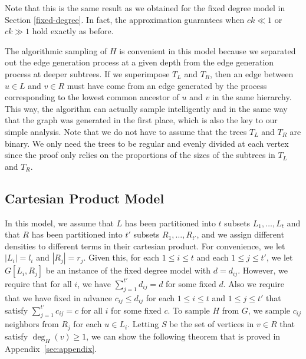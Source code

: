 Note that this is the same result as we obtained for the fixed degree
model in Section \ref{fixed-degree}. In fact, the approximation
guarantees when $ck \ll 1$ or $ck \gg 1$ hold exactly as before.\vs

The algorithmic sampling of $H$ is convenient in this model because we separated
out the edge generation process at a given depth from the edge
generation process at deeper subtrees.
If we superimpose $T_L$
and $T_R$, then an edge between $u\in L$ and $v\in R$ must have
come from an edge generated by the process corresponding to the lowest common ancestor of $u$ and $v$ in the same hierarchy. This way, the algorithm can actually sample intelligently and in the same way that the graph was generated in the first place, which is also the key to our simple analysis. Note
that we do not have to assume that the trees $T_L$ and $T_R$ are
binary. We only need the trees to be regular and evenly divided at
each vertex since the proof only relies on the proportions of the
sizes of the subtrees in $T_L$ and $T_R$.


\subsection{Cartesian Product Model}
\label{cartesian}
In this model, we assume that
$L$ has been partitioned into $t$ subsets $L_1,\ldots, L_t$ and
that $R$ has been partitioned into $t'$ subsets $R_1,\ldots,
R_{t'}$, and we assign different densities to different terms in their cartesian product. For convenience, we let $|L_i| = l_i$ and $|R_j|=r_j$. Given
this, for each $1\leq i\leq t$ and each $1\leq j\leq t'$,
we let $G[L_i, R_j]$ be an instance of the fixed degree model with
$d=d_{ij}$. However, we require that for all $i$, we have $\sum_{j=1}^{t'}
d_{ij} = d$ for some fixed $d$. Also we require that we have fixed in
advance $c_{ij} \leq d_{ij}$ for each $1\leq i\leq t$ and $1\leq j\leq t'$ that
satisfy $\sum_{j=1}^{t'} c_{ij} = c$ for all $i$ for some fixed $c$.
To sample $H$ from $G$, we sample $c_{ij}$ neighbors from $R_j$ for each
$u\in L_i$. Letting $S$ be the set of vertices in
$v\in R$ that satisfy $\deg_H(v)\geq 1$, we can show the following theorem
that is proved in Appendix~\ref{sec:appendix}.


